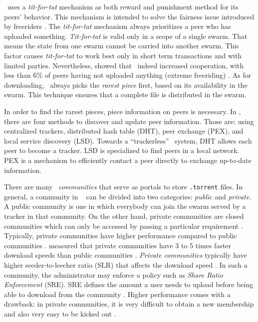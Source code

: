 \bt~uses a \textit{tit-for-tat} mechanism as both reward and punishment method for its peers' behavior. This mechanism is intended to solve the fairness issue introduced by freeriders \cite{2003:bittorrent:cohen}. The \textit{tit-for-tat} mechanism always prioritizes a peer who has uploaded something. \textit{Tit-for-tat} is valid only in a scope of a single swarm. That means the state from one swarm cannot be carried into another swarm. This factor causes \textit{tit-for-tat} to work best only in short term transactions and with limited parties. Nevertheless, \citeauthor{2005:bittorrentcooperation:andrade} showed that \bt~indeed increased cooperation, with less than 6\% of peers having not uploaded anything (extreme freeriding) \cite{2005:bittorrentcooperation:andrade}. As for downloading, \bt~always picks the \textit{rarest piece} first, based on its availability in the swarm. This technique ensures that a complete file is distributed in the swarm.

In order to find the rarest pieces, piece information on peers is necessary. In \bt, there are four methods to discover and update peer information. Those are: using centralized trackers, distributed hash table (DHT), peer exchange (PEX), and local service discovery (LSD). Towards a ``trackerless'' \bt~system, DHT allows each peer to become a tracker. LSD is specialized to find peers in a local network. PEX is a mechanism to efficiently contact a peer directly to exchange up-to-date information.

There are many \bt~\textit{communities} that serve as portals to store \texttt{.torrent} files. In general, a community in \bt~ can be divided into two categories: \textit{public} and \textit{private}. A public community is one in which everybody can join the swarm served by a tracker in that community. On the other hand, private communities are closed communities which can only be accessed by passing a particular requirement \cite{2010:pubpriv:meulpolder, 2014:sustainabilitytorrent:chen}. Typically, private communities have higher performance compared to public communities \cite{2010:pubpriv:meulpolder}. \citeauthor{2010:pubpriv:meulpolder} measured that private communities have 3 to 5 times faster download speeds than public communities \cite{2010:pubpriv:meulpolder}. \textit{Private communities} typically have higher seeder-to-leecher ratio (SLR) that affects the download speed \cite{2005:bittorrentcooperation:andrade}. In such a community, the administrator may enforce a policy such as \textit{Share Ratio Enforcement} (SRE). SRE defines the amount a user needs to upload before being able to download from the community \cite{2012:economicbt:kash}. 
Higher performance comes with a drawback: in private communities, it is very difficult to obtain a new membership and also very easy to be kicked out \cite{2013:survivepriv:jia}.

